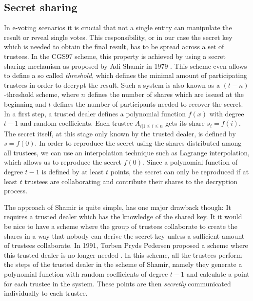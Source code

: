 \documentclass[numbers=noenddot, abstract=on, a4paper, headsepline,
footsepline, oneside, draft=off]{scrreprt}
\begin{document}
\subsection{Secret sharing}
\label{sec:secretsharing}
In e-voting scenarios it is crucial that not a
single entity can manipulate the result or reveal single votes. This
responsibility, or in our case the secret key which is needed to obtain the
final result, has to be spread across a set of trustees. In the CGS97 scheme,
this property is achieved by using a secret sharing mechanism as proposed by Adi
Shamir in 1979 \cite{Shamir79}. This scheme even allows to define a so called
\textit{threshold}, which defines the minimal amount of participating trustees
in order to decrypt the result. Such a system is also known as a
$(t-n)$-threshold scheme, where $n$ defines the number of shares which are
issued at the beginning and $t$ defines the number of participants needed to
recover the secret. In a first step, a trusted dealer defines a polynomial
function $f(x)$ with degree $t-1$ and random coefficients. Each trustee $A_{i |
1 \leq i \leq n}$ gets its share $s_i=f(i)$. The secret itself, at this stage
only known by the trusted dealer, is defined by $s=f(0)$. In order to reproduce the
secret using the shares distributed among all trustees, we can use an
interpolation technique such as Lagrange interpolation, which allows us to
reproduce the secret $f(0)$. Since a polynomial function of degree $t-1$ is
defined by at least $t$ points, the secret can only be reproduced if at least
$t$ trustees are collaborating and contribute their shares to the decryption
process.

The approach of Shamir is quite simple, has one major drawback though: It
requires a trusted dealer which has the knowledge of the shared key. It it
would be nice to have a scheme where the group of trustees collaborate to create
the shares in a way that nobody can derive the secret key unless a sufficient
amount of trustees collaborate. In 1991, Torben Pryds Pedersen proposed a scheme
where this trusted dealer is no longer needed \cite{PED91}. In this scheme, all the
trustees perform the steps of the trusted dealer in the scheme of Shamir, namely
they generate a polynomial function with random coefficients of degree $t-1$ and
calculate a point for each trustee in the system. These points are then
\textit{secretly} communicated individually to each trustee.
\end{document}
